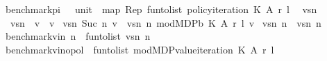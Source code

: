 \begin{isabellebody}
\isamarkupfalse%
\ {\isachardoublequoteopen}benchmark{\isacharunderscore}{\kern0pt}pi\ {\isacharparenleft}{\kern0pt}{\isacharunderscore}{\kern0pt}\ {\isacharcolon}{\kern0pt}{\isacharcolon}{\kern0pt}\ unit{\isacharparenright}{\kern0pt}\ {\isacharequal}{\kern0pt}\ map\ Rep\ {\isacharparenleft}{\kern0pt}fun{\isacharunderscore}{\kern0pt}to{\isacharunderscore}{\kern0pt}list\ {\isacharparenleft}{\kern0pt}policy{\isacharunderscore}{\kern0pt}iteration\ K\ A\ r\ l\ {}{\isacharparenright}{\kern0pt}{\isacharparenright}{\kern0pt}{\isachardoublequoteclose}\isanewline
\isanewline
{}\isamarkupfalse%
\ vs{\isacharunderscore}{\kern0pt}n\ \isanewline
\ \ {\isachardoublequoteopen}vs{\isacharunderscore}{\kern0pt}n\ {}\ v\ {\isacharequal}{\kern0pt}\ v{\isachardoublequoteclose}\isanewline
{\isacharbar}{\kern0pt}\ {\isachardoublequoteopen}vs{\isacharunderscore}{\kern0pt}n\ {\isacharparenleft}{\kern0pt}Suc\ n{\isacharparenright}{\kern0pt}\ v\ {\isacharequal}{\kern0pt}\ vs{\isacharunderscore}{\kern0pt}n\ n\ {\isacharparenleft}{\kern0pt}mod{\isacharunderscore}{\kern0pt}MDP{\isacharunderscore}{\kern0pt}{\isasymL}\isactrlsub b\ K\ A\ r\ l\ v{\isacharparenright}{\kern0pt}{\isachardoublequoteclose}\isanewline
\isanewline
{}\isamarkupfalse%
\ {\isachardoublequoteopen}vs{\isacharunderscore}{\kern0pt}n{\isacharprime}{\kern0pt}\ n\ {\isacharequal}{\kern0pt}\ vs{\isacharunderscore}{\kern0pt}n\ n\ {}{\isachardoublequoteclose}\isanewline
\isanewline
{}\isamarkupfalse%
\ {\isachardoublequoteopen}benchmark{\isacharunderscore}{\kern0pt}vi{\isacharunderscore}{\kern0pt}n\ n\ {\isacharequal}{\kern0pt}\ {\isacharparenleft}{\kern0pt}fun{\isacharunderscore}{\kern0pt}to{\isacharunderscore}{\kern0pt}list\ {\isacharparenleft}{\kern0pt}vs{\isacharunderscore}{\kern0pt}n\ n\ {}{\isacharparenright}{\kern0pt}{\isacharparenright}{\kern0pt}{\isachardoublequoteclose}\isanewline
{}\isamarkupfalse%
\ {\isachardoublequoteopen}benchmark{\isacharunderscore}{\kern0pt}vi{\isacharunderscore}{\kern0pt}nopol\ {\isacharequal}{\kern0pt}\ {\isacharparenleft}{\kern0pt}fun{\isacharunderscore}{\kern0pt}to{\isacharunderscore}{\kern0pt}list\ {\isacharparenleft}{\kern0pt}mod{\isacharunderscore}{\kern0pt}MDP{\isacharunderscore}{\kern0pt}value{\isacharunderscore}{\kern0pt}iteration\ K\ A\ r\ l\ {\isacharparenleft}{\kern0pt}{}{\isacharslash}{\kern0pt}{}{}{\isacharparenright}{\kern0pt}\ {}{\isacharparenright}{\kern0pt}{\isacharparenright}{\kern0pt}{\isachardoublequoteclose}\isanewline

\end{isabellebody}
